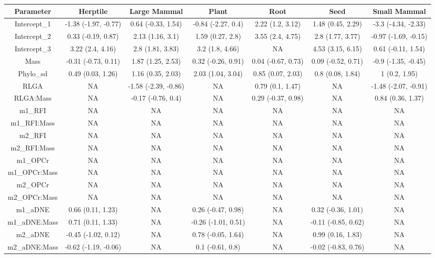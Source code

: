 \begin{table}
\centering\begingroup\fontsize{10}{12}\selectfont

\begin{tabular}[t]{c|c|c|c|c|c|c}
\hline
Parameter & Herptile & Large Mammal & Plant & Root & Seed & Small Mammal\\
\hline
Intercept_1 & -1.38 (-1.97, -0.77) & 0.64 (-0.33, 1.54) & -0.84 (-2.27, 0.4) & 2.22 (1.2, 3.12) & 1.48 (0.45, 2.29) & -3.3 (-4.34, -2.33)\\
\hline
Intercept_2 & 0.33 (-0.19, 0.87) & 2.13 (1.16, 3.1) & 1.59 (0.27, 2.8) & 3.55 (2.4, 4.75) & 2.8 (1.77, 3.77) & -0.97 (-1.69, -0.15)\\
\hline
Intercept_3 & 3.22 (2.4, 4.16) & 2.8 (1.81, 3.83) & 3.2 (1.8, 4.66) & NA & 4.53 (3.15, 6.15) & 0.61 (-0.11, 1.54)\\
\hline
Mass & -0.31 (-0.73, 0.11) & 1.87 (1.25, 2.53) & 0.32 (-0.26, 0.91) & 0.04 (-0.67, 0.73) & 0.09 (-0.52, 0.71) & -0.9 (-1.35, -0.45)\\
\hline
Phylo_sd & 0.49 (0.03, 1.26) & 1.16 (0.35, 2.03) & 2.03 (1.04, 3.04) & 0.85 (0.07, 2.03) & 0.8 (0.08, 1.84) & 1 (0.2, 1.95)\\
\hline
RLGA & NA & -1.58 (-2.39, -0.86) & NA & 0.79 (0.1, 1.47) & NA & -1.48 (-2.07, -0.91)\\
\hline
RLGA:Mass & NA & -0.17 (-0.76, 0.4) & NA & 0.29 (-0.37, 0.98) & NA & 0.84 (0.36, 1.37)\\
\hline
m1_RFI & NA & NA & NA & NA & NA & NA\\
\hline
m1_RFI:Mass & NA & NA & NA & NA & NA & NA\\
\hline
m2_RFI & NA & NA & NA & NA & NA & NA\\
\hline
m2_RFI:Mass & NA & NA & NA & NA & NA & NA\\
\hline
m1_OPCr & NA & NA & NA & NA & NA & NA\\
\hline
m1_OPCr:Mass & NA & NA & NA & NA & NA & NA\\
\hline
m2_OPCr & NA & NA & NA & NA & NA & NA\\
\hline
m2_OPCr:Mass & NA & NA & NA & NA & NA & NA\\
\hline
m1_aDNE & 0.66 (0.11, 1.23) & NA & 0.26 (-0.47, 0.98) & NA & 0.32 (-0.36, 1.01) & NA\\
\hline
m1_aDNE:Mass & 0.71 (0.11, 1.33) & NA & -0.26 (-1.01, 0.51) & NA & -0.11 (-0.85, 0.62) & NA\\
\hline
m2_aDNE & -0.45 (-1.02, 0.12) & NA & 0.78 (-0.05, 1.64) & NA & 0.99 (0.16, 1.83) & NA\\
\hline
m2_aDNE:Mass & -0.62 (-1.19, -0.06) & NA & 0.1 (-0.61, 0.8) & NA & -0.02 (-0.83, 0.76) & NA\\
\hline
\end{tabular}
\endgroup{}
\end{table}
